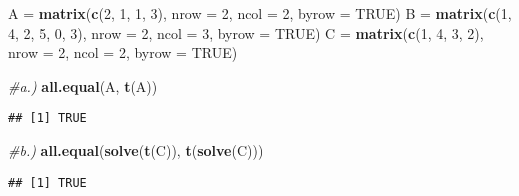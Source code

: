 \documentclass[
]{article}
\newenvironment{Shaded}{\begin{snugshade}}{\end{snugshade}}
\newcommand{\CommentTok}[1]{\textcolor[rgb]{0.56,0.35,0.01}{\textit{#1}}}
\newcommand{\DataTypeTok}[1]{\textcolor[rgb]{0.13,0.29,0.53}{#1}}
\newcommand{\DecValTok}[1]{\textcolor[rgb]{0.00,0.00,0.81}{#1}}
\newcommand{\KeywordTok}[1]{\textcolor[rgb]{0.13,0.29,0.53}{\textbf{#1}}}
\newcommand{\NormalTok}[1]{#1}
\newcommand{\OperatorTok}[1]{\textcolor[rgb]{0.81,0.36,0.00}{\textbf{#1}}}
\newcommand{\OtherTok}[1]{\textcolor[rgb]{0.56,0.35,0.01}{#1}}
\newcommand{\StringTok}[1]{\textcolor[rgb]{0.31,0.60,0.02}{#1}}
\begin{document}
\begin{Shaded}
\begin{Highlighting}[]
\NormalTok{A =}\StringTok{ }\KeywordTok{matrix}\NormalTok{(}\KeywordTok{c}\NormalTok{(}\DecValTok{2}\NormalTok{, }\DecValTok{1}\NormalTok{, }\DecValTok{1}\NormalTok{, }\DecValTok{3}\NormalTok{),}
           \DataTypeTok{nrow =} \DecValTok{2}\NormalTok{,}
           \DataTypeTok{ncol =} \DecValTok{2}\NormalTok{,}
           \DataTypeTok{byrow =} \OtherTok{TRUE}\NormalTok{)}
\NormalTok{B =}\StringTok{ }\KeywordTok{matrix}\NormalTok{(}\KeywordTok{c}\NormalTok{(}\DecValTok{1}\NormalTok{, }\DecValTok{4}\NormalTok{, }\DecValTok{2}\NormalTok{, }\DecValTok{5}\NormalTok{, }\DecValTok{0}\NormalTok{, }\DecValTok{3}\NormalTok{),}
           \DataTypeTok{nrow =} \DecValTok{2}\NormalTok{,}
           \DataTypeTok{ncol =} \DecValTok{3}\NormalTok{,}
           \DataTypeTok{byrow =} \OtherTok{TRUE}\NormalTok{)}
\NormalTok{C =}\StringTok{ }\KeywordTok{matrix}\NormalTok{(}\KeywordTok{c}\NormalTok{(}\DecValTok{1}\NormalTok{, }\DecValTok{4}\NormalTok{, }\DecValTok{3}\NormalTok{, }\DecValTok{2}\NormalTok{),}
           \DataTypeTok{nrow =} \DecValTok{2}\NormalTok{,}
           \DataTypeTok{ncol =} \DecValTok{2}\NormalTok{,}
           \DataTypeTok{byrow =} \OtherTok{TRUE}\NormalTok{)}

\CommentTok{#a.)}
\KeywordTok{all.equal}\NormalTok{(A, }\KeywordTok{t}\NormalTok{(A))}
\end{Highlighting}
\end{Shaded}

\begin{verbatim}
## [1] TRUE
\end{verbatim}

\begin{Shaded}
\begin{Highlighting}[]
\CommentTok{#b.)}
\KeywordTok{all.equal}\NormalTok{(}\KeywordTok{solve}\NormalTok{(}\KeywordTok{t}\NormalTok{(C)), }\KeywordTok{t}\NormalTok{(}\KeywordTok{solve}\NormalTok{(C)))}
\end{Highlighting}
\end{Shaded}

\begin{verbatim}
## [1] TRUE
\end{verbatim}

\begin{Shaded}
\end{Shaded}
\end{document}
